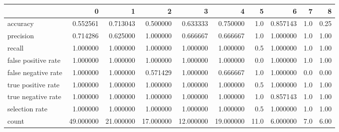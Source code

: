 \begin{tabular}{lrrrrrrrrr}
\toprule
{} &          0 &          1 &          2 &          3 &          4 &     5 &         6 &    7 &     8 \\
\midrule
accuracy            &   0.552561 &   0.713043 &   0.500000 &   0.633333 &   0.750000 &   1.0 &  0.857143 &  1.0 &  0.25 \\
precision           &   0.714286 &   0.625000 &   1.000000 &   0.666667 &   0.666667 &   1.0 &  1.000000 &  1.0 &  1.00 \\
recall              &   1.000000 &   1.000000 &   1.000000 &   1.000000 &   1.000000 &   0.5 &  1.000000 &  1.0 &  1.00 \\
false positive rate &   1.000000 &   1.000000 &   1.000000 &   1.000000 &   1.000000 &   0.0 &  1.000000 &  1.0 &  1.00 \\
false negative rate &   1.000000 &   1.000000 &   0.571429 &   1.000000 &   0.666667 &   1.0 &  1.000000 &  0.0 &  0.00 \\
true positive rate  &   1.000000 &   1.000000 &   1.000000 &   1.000000 &   1.000000 &   0.5 &  1.000000 &  1.0 &  1.00 \\
true negative rate  &   1.000000 &   1.000000 &   1.000000 &   1.000000 &   1.000000 &   1.0 &  0.857143 &  1.0 &  1.00 \\
selection rate      &   1.000000 &   1.000000 &   1.000000 &   1.000000 &   1.000000 &   0.5 &  1.000000 &  1.0 &  1.00 \\
count               &  49.000000 &  21.000000 &  17.000000 &  12.000000 &  19.000000 &  11.0 &  6.000000 &  7.0 &  6.00 \\
\bottomrule
\end{tabular}
